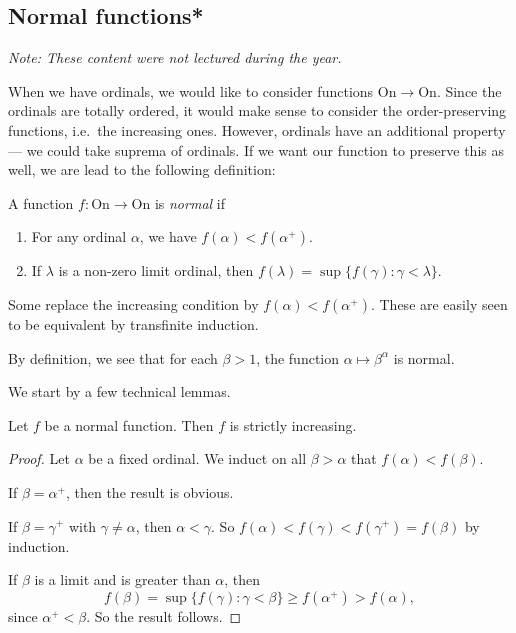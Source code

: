 \documentclass[a4paper]{article}
\begin{document}
\subsection{Normal functions*}
\begin{own}
  \emph{Note: These content were not lectured during the year.}

  When we have ordinals, we would like to consider functions $\mathrm{On} \to \mathrm{On}$. Since the ordinals are totally ordered, it would make sense to consider the order-preserving functions, i.e.\ the increasing ones. However, ordinals have an additional property --- we could take suprema of ordinals. If we want our function to preserve this as well, we are lead to the following definition:

  \begin{defi}
    A function $f: \mathrm{On} \to \mathrm{On}$ is \emph{normal} if
    \begin{enumerate}
      \item For any ordinal $\alpha$, we have $f(\alpha) < f(\alpha^+)$.
      \item If $\lambda$ is a non-zero limit ordinal, then $f(\lambda) = \sup \{f(\gamma): \gamma < \lambda\}$.
    \end{enumerate}
  \end{defi}
  Some replace the increasing condition by $f(\alpha) < f(\alpha^+)$. These are easily seen to be equivalent by transfinite induction.

  \begin{eg}
    By definition, we see that for each $\beta > 1$, the function $\alpha \mapsto \beta^\alpha$ is normal.
  \end{eg}

  We start by a few technical lemmas.
  \begin{lemma}
    Let $f$ be a normal function. Then $f$ is strictly increasing.
  \end{lemma}

  \begin{proof}
    Let $\alpha$ be a fixed ordinal. We induct on all $\beta > \alpha$ that $f(\alpha) < f(\beta)$.

    If $\beta = \alpha^+$, then the result is obvious.

    If $\beta = \gamma^+$ with $\gamma \not= \alpha$, then $\alpha < \gamma$. So $f(\alpha) < f(\gamma) < f(\gamma^+) = f(\beta)$ by induction.

    If $\beta$ is a limit and is greater than $\alpha$, then
    \[
      f(\beta) = \sup\{f(\gamma): \gamma < \beta\} \geq f(\alpha^+) > f(\alpha),
    \]
    since $\alpha^+ < \beta$. So the result follows.
  \end{proof}


\end{own}
\end{document}
